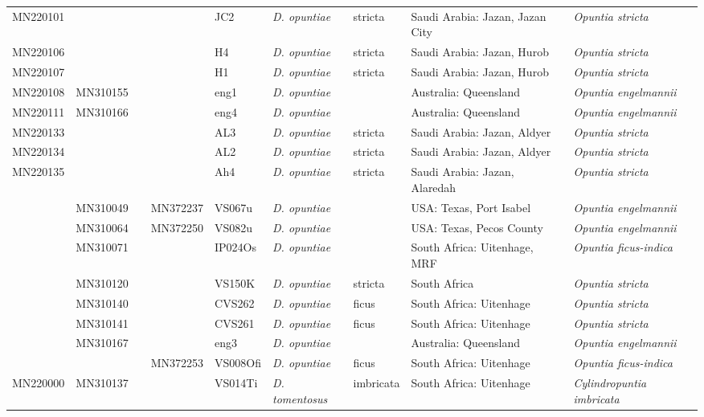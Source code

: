 \begin{landscape}
{\begin{longtable}{@{}lllllp{2.7cm}p{2.2cm}p{5cm}p{4cm}@{}}
MN220101 &  &  &  & JC2 & \textit{D. opuntiae} & stricta & Saudi Arabia: Jazan, Jazan City & \textit{Opuntia stricta} \\
MN220106 &  &  &  & H4 & \textit{D. opuntiae} & stricta & Saudi Arabia: Jazan, Hurob & \textit{Opuntia stricta} \\
MN220107 &  &  &  & H1 & \textit{D. opuntiae} & stricta & Saudi Arabia: Jazan, Hurob & \textit{Opuntia stricta} \\
MN220108 & MN310155 &  &  & eng1 & \textit{D. opuntiae} &  & Australia: Queensland & \textit{Opuntia engelmannii} \\
MN220111 & MN310166 &  &  & eng4 & \textit{D. opuntiae} &  & Australia: Queensland & \textit{Opuntia engelmannii} \\
MN220133 &  &  &  & AL3 & \textit{D. opuntiae} & stricta & Saudi Arabia: Jazan, Aldyer & \textit{Opuntia stricta} \\
MN220134 &  &  &  & AL2 & \textit{D. opuntiae} & stricta & Saudi Arabia: Jazan, Aldyer & \textit{Opuntia stricta} \\
MN220135 &  &  &  & Ah4 & \textit{D. opuntiae} & stricta & Saudi Arabia: Jazan, Alaredah & \textit{Opuntia stricta} \\
 & MN310049 &  & MN372237 & VS067u & \textit{D. opuntiae} &  & USA: Texas, Port Isabel & \textit{Opuntia engelmannii} \\
 & MN310064 &  & MN372250 & VS082u & \textit{D. opuntiae} &  & USA: Texas, Pecos County & \textit{Opuntia engelmannii} \\
 & MN310071 &  &  & IP024Os & \textit{D. opuntiae} &  & South Africa: Uitenhage, MRF & \textit{Opuntia ficus-indica} \\
 & MN310120 &  &  & VS150K & \textit{D. opuntiae} & stricta & South Africa & \textit{Opuntia stricta} \\
 & MN310140 &  &  & CVS262 & \textit{D. opuntiae} & ficus & South Africa: Uitenhage & \textit{Opuntia stricta} \\
 & MN310141 &  &  & CVS261 & \textit{D. opuntiae} & ficus & South Africa: Uitenhage & \textit{Opuntia stricta} \\
 & MN310167 &  &  & eng3 & \textit{D. opuntiae} &  & Australia: Queensland & \textit{Opuntia engelmannii} \\
 &  &  & MN372253 & VS008Ofi & \textit{D. opuntiae} & ficus & South Africa: Uitenhage & \textit{Opuntia ficus-indica} \\
MN220000 & MN310137 &  &  & VS014Ti & \textit{D. tomentosus} & imbricata & South Africa: Uitenhage & \textit{Cylindropuntia imbricata} \\

\end{longtable}}
\end{landscape}
